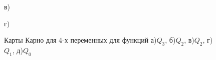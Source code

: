 \documentclass[a4paper,14pt]{extarticle}
\begin{document}
\begin{center}
\begin{figure}
\begin{minipage}[h]{0.47\linewidth}
	\end{minipage}
	\vfill
	\begin{minipage}[h]{0.47\linewidth}
		 в) \\
	\end{minipage}
	\hfill
	\begin{minipage}[h]{0.47\linewidth}
		 г) \\
	\end{minipage}
	\caption{Карты Карно для 4-х переменных для функций а)$Q_3$, б)$Q_2$, в)$Q_2$, г)$Q_1$, д)$Q_0$}
	\label{ris:karno-maps}
\end{figure}
\end{center}
\end{document}
